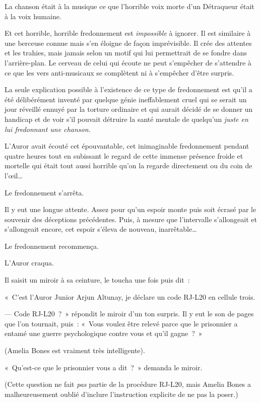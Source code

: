 La chanson était à la musique ce que l'horrible voix morte d'un Détraqueur était à la voix humaine.

Et cet horrible, horrible fredonnement est \emph{impossible} à ignorer.
Il est similaire à une berceuse connue mais s'en éloigne de façon imprévisible.
Il crée des attentes et les trahies, mais jamais selon un motif qui lui permettrait de se fondre dans l'arrière-plan.
Le cerveau de celui qui écoute ne peut s'empêcher de s'attendre à ce que les vers anti-musicaux se complètent ni à s'empêcher d'être surpris.

La seule explication possible à l'existence de ce type de fredonnement est qu'il a été délibérément inventé par quelque génie ineffablement cruel qui se serait un jour réveillé ennuyé par la torture ordinaire et qui aurait décidé de se donner un handicap et de voir s'il pouvait détruire la santé mentale de quelqu'un \emph{juste en lui fredonnant une chanson.}

L'Auror avait écouté cet épouvantable, cet inimaginable fredonnement pendant quatre heures tout en subissant le regard de cette immense présence froide et mortelle qui était tout aussi horrible qu'on la regarde directement ou du coin de l'œil…

Le fredonnement s'arrêta.

Il y eut une longue attente.
Assez pour qu'un espoir monte puis soit écrasé par le souvenir des déceptions précédentes.
Puis, à mesure que l'intervalle s'allongeait et s'allongeait encore, cet espoir s'éleva de nouveau, inarrêtable…

Le fredonnement recommença.

L'Auror craqua.

Il saisit un miroir à sa ceinture, le toucha une fois puis dit~:

«~C'est l'Auror Junior Arjun Altunay, je déclare un code RJ-L20 en cellule trois.

--- Code RJ-L20~?~»
répondit le miroir d'un ton surpris.
Il y eut le son de pages que l'on tournait, puis~: «~Vous voulez être relevé parce que le prisonnier a entamé une guerre psychologique contre vous et qu'il gagne~?~»

(Amelia Bones est vraiment très intelligente).

«~Qu'est-ce que le prisonnier vous a dit~?~»
demanda le miroir.

(Cette question ne fait \emph{pas} partie de la procédure RJ-L20, mais Amelia Bones a malheureusement oublié d'inclure l'instruction explicite de ne pas la poser.)

